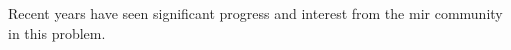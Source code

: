 

Recent years have seen significant progress and interest from the \gls{mir} community in this problem.
